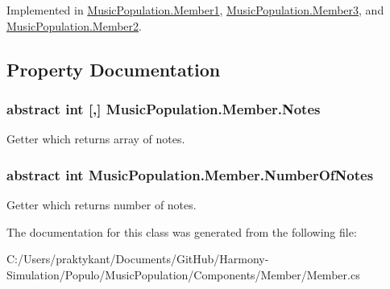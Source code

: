 Implemented in \hyperlink{class_music_population_1_1_member1_acb90358a28ed446f2373fe0be35a8b01}{Music\+Population.\+Member1}, \hyperlink{class_music_population_1_1_member3_a3148bb13399637bb2cf2addf6d8ecbec}{Music\+Population.\+Member3}, and \hyperlink{class_music_population_1_1_member2_a1978ab05a86b98491d5ce7d201cfd4f0}{Music\+Population.\+Member2}.



\subsection{Property Documentation}
\hypertarget{class_music_population_1_1_member_a0c7562c7c67ef2fbdf57fa1c6cab9b70}{
\subsubsection[{Notes}]{\setlength{\rightskip}{0pt plus 5cm}abstract int \mbox{[},\mbox{]} Music\+Population.\+Member.\+Notes\hspace{0.3cm}{\ttfamily [get]}}}\label{class_music_population_1_1_member_a0c7562c7c67ef2fbdf57fa1c6cab9b70}


Getter which returns array of notes. 

\hypertarget{class_music_population_1_1_member_af0a14babb0cd654761c327e927ebdd8d}{
\subsubsection[{Number\+Of\+Notes}]{\setlength{\rightskip}{0pt plus 5cm}abstract int Music\+Population.\+Member.\+Number\+Of\+Notes\hspace{0.3cm}{\ttfamily [get]}}}\label{class_music_population_1_1_member_af0a14babb0cd654761c327e927ebdd8d}


Getter which returns number of notes. 



The documentation for this class was generated from the following file\+:\begin{DoxyCompactItemize}
\item 
C\+:/\+Users/praktykant/\+Documents/\+Git\+Hub/\+Harmony-\/\+Simulation/\+Populo/\+Music\+Population/\+Components/\+Member/Member.\+cs\end{DoxyCompactItemize}
